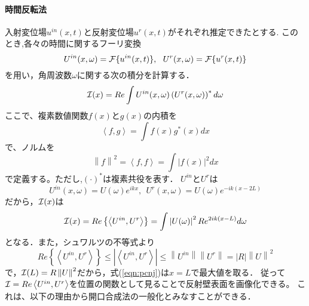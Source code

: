 \documentclass[10pt,a4j,dvipdfmx]{jarticle}
\begin{document}
\paragraph{時間反転法}
入射変位場$u^{in}(x,t)$と反射変位場$u^{r}(x,t)$がそれぞれ推定できたとする.
このとき,各々の時間に関するフーリ変換
\begin{equation}
	U^{in}(x,\omega)={\cal F} \{ u^{in}(x,t)\}, \ \ 
	U^{r}(x,\omega)={\cal F} \{ u^{r}(x,t)\}
	\label{eqn:}
\end{equation}
を用い，角周波数$\omega$に関する次の積分を計算する．
\begin{equation}
	{\cal I }(x)=
	Re 
	\int 	
	U^{in}(x,\omega)\left( U^{r}(x,\omega)\right)^* d\omega
	\label{eqn:}
\end{equation}
ここで、複素数値関数$f(x)$と$g(x)$の内積を
\begin{equation}
	\left< f,g\right>=\int f(x)g^*(x)dx
	\label{eqn:}
\end{equation}
で、ノルムを
\begin{equation}
	\left\| f \right\|^2=\left<f,f\right> =\int |f(x)|^2dx
	\label{eqn:}
\end{equation}
で定義する。ただし,$(\cdot)^*$は複素共役を表す．
$U^{in}$と$U^{r}$は
\begin{equation}
	U^{in}(x,\omega)=U(\omega)e^{ikx}, \ \ 
	U^{r}(x,\omega)=U(\omega)e^{-ik(x-2L)}
	\label{eqn:}
\end{equation}
だから，${\cal I}(x)$は
\begin{equation}
	{\cal I}(x)
	=
	Re \left\{ 
	\left< U^{in},U^{r}\right>
	\right\}
	=
	\int 
	\left| U(\omega) \right|^2 
	R
	e^{2ik(x-L)}d\omega
	\label{eqn:pcnj}
\end{equation}
となる．また，シュワルツの不等式より
\begin{equation}
	Re \left\{ \left< U^{in}, U^{r}\right> \right\}
	\leq 
	\left| \left< U^{in},U^{r} \right> \right|
	\leq  \left\| U^{in}\right\| \left\| U^{r}\right\|
	=\left| R \right|
	\left\| U\right\|^2
	\label{eqn:}
\end{equation}
で，${\cal I}(L)=R \left\| U\right\|^2$だから，式(\ref{eqn:pcnj})は$x=L$で最大値を取る．
従って${\cal I}=Re \left<U^{in},U^{r}\right>$を位置の関数として見ることで反射壁表面を画像化できる。
これは、以下の理由から開口合成法の一般化とみなすことができる．
\end{document}
